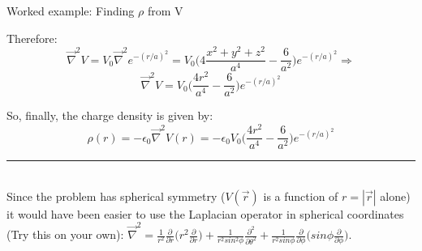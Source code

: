 {\begin{frame}{Worked example: Finding $\rho$ from V}
\vspace{0.1cm}

Therefore:
\begin{equation*}
  \vec{\nabla}^{2} V
     = V_{0} \vec{\nabla}^{2} e^{-(r/a)^2}
     = V_{0} \Big( 4\frac{x^2+y^2+z^2}{a^4} - \frac{6}{a^2} \Big)  e^{-(r/a)^2} \Rightarrow
\end{equation*}
\begin{equation*}
  \vec{\nabla}^{2} V
     = V_{0} \Big( \frac{4r^2}{a^4} - \frac{6}{a^2} \Big)  e^{-(r/a)^2}
\end{equation*}

\vspace{0.1cm}

So, finally, the charge density is given by:
\begin{equation*}
  \rho(r) = -\epsilon_0 \vec{\nabla}^{2} V(r) = -\epsilon_0 V_{0} \Big( \frac{4r^2}{a^4} - \frac{6}{a^2} \Big)  e^{-(r/a)^2}
\end{equation*}

\noindent\rule{2cm}{0.4pt}\\
{\scriptsize
Since the problem has spherical symmetry ($V(\vec{r})$ is a function of $r=|\vec{r}|$ alone)
it would have been easier to use the Laplacian operator in spherical coordinates (Try this on your own):
$\vec{\nabla}^{2} =
    \frac{1}{r^2} \frac{\partial}{\partial r} \Big( r^2 \frac{\partial}{\partial r} \Big) +
    \frac{1}{r^2 sin^{2}\phi} \frac{\partial^{2}}{\partial {\theta}^{2}} +
    \frac{1}{r^2 sin\phi} \frac{\partial}{\partial \phi} \Big( sin\phi \frac{\partial}{\partial \phi} \Big)$.
}

\end{frame}

} %

%
%
%

